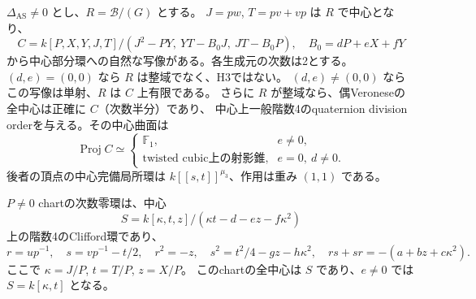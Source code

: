 \begin{theorem}
\label{thm:h3-order2-eight-scroll-order}
$\Delta_{\mathrm{AS}}\ne0$ とし、$R=\mathcal B/(G)$ とする。
$J=pw$, $T=pv+vp$ は $R$ で中心となり、
\begin{equation}\label{eq:h3-order2-eight-scroll-center}
 C=k[P,X,Y,J,T]/(J^2-PY,\ YT-B_0J,\ JT-B_0P),\quad B_0=dP+eX+fY
\end{equation}
から中心部分環への自然な写像がある。各生成元の次数は2とする。
$(d,e)=(0,0)$ なら $R$ は整域でなく、H3ではない。
$(d,e)\ne(0,0)$ ならこの写像は単射、$R$ は $C$ 上有限である。
さらに $R$ が整域なら、偶Veroneseの全中心は正確に $C$（次数半分）であり、
中心上一般階数4のquaternion division orderを与える。その中心曲面は
\[
 \operatorname{Proj}C\simeq
 \begin{cases}
 \mathbb F_1,&e\ne0,\\
 \text{twisted cubic上の射影錐},&e=0,\ d\ne0.
 \end{cases}
\]
後者の頂点の中心完備局所環は $k[[s,t]]^{\mu_3}$、作用は重み $(1,1)$ である。

$P\ne0$ chartの次数零環は、中心
\[
 S=k[\kappa,t,z]/(\kappa t-d-ez-f\kappa^2)
\]
上の階数4のClifford環であり、
\begin{equation}\label{eq:h3-order2-eight-P-chart}
 r=up^{-1},\quad s=vp^{-1}-t/2,\quad
 r^2=-z,\quad s^2=t^2/4-gz-h\kappa^2,\quad
 rs+sr=-(a+bz+c\kappa^2).
\end{equation}
ここで $\kappa=J/P$, $t=T/P$, $z=X/P$。
このchartの全中心は $S$ であり、$e\ne0$ では $S=k[\kappa,t]$ となる。
\end{theorem}
